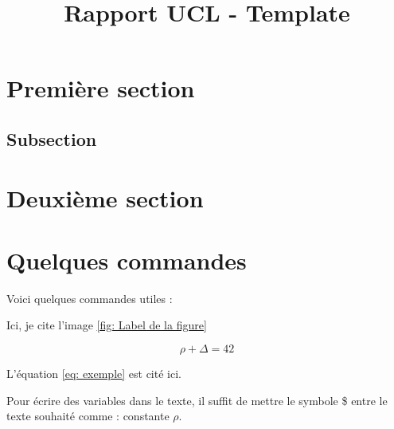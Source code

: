 \documentclass{rapport}
\title{Rapport UCL - Template} %
\begin{document}




        
\fairemarges %
\fairepagedegarde %
\tabledematieres %



\section{Première section} 

\lipsum[3-4]%

\subsection{Subsection}

\lipsum[3-4] %

\section{Deuxième section}

\lipsum[3-5] %


\section{Quelques commandes}

Voici quelques commandes utiles :


Ici, je cite l'image \ref{fig: Label de la figure}



\begin{equation} \label{eq: exemple}
\rho + \Delta = 42
\end{equation}

L'équation \ref{eq: exemple} est cité ici. 


Pour écrire des variables dans le texte, il suffit de mettre le symbole \$ entre le texte souhaité comme : constante $\rho$. 
\end{document}
